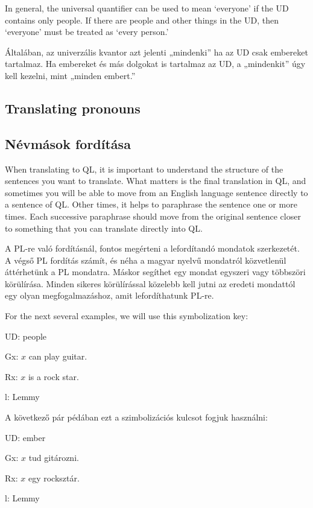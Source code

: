 In general, the universal quantifier can be used to mean `everyone' if the UD contains only people. If there are people and other things in the UD, then `everyone' must be treated as `every person.'

Általában, az univerzális kvantor azt jelenti „mindenki” ha az UD csak embereket tartalmaz. Ha embereket és más dolgokat is tartalmaz az UD, a „mindenkit” úgy kell kezelni, mint „minden embert.”





\subsection*{Translating pronouns}
\subsection{Névmások fordítása}
When translating to QL, it is important to understand the structure of the sentences you want to translate. What matters is the final translation in QL, and sometimes you will be able to move from an English language sentence directly to a sentence of QL. Other times, it helps to paraphrase the sentence one or more times. Each successive paraphrase should move from the original sentence closer to something that you can translate directly into QL.


A PL-re való fordításnál, fontos megérteni a lefordítandó mondatok szerkezetét. A végső PL fordítás számít, és néha a magyar nyelvű mondatról közvetlenül áttérhetünk a PL mondatra. Máskor segíthet egy mondat egyszeri vagy többszöri körülírása. Minden sikeres körülírással közelebb kell jutni az eredeti mondattól egy olyan megfogalmazáshoz, amit lefordíthatunk PL-re.

For the next several examples, we will use this symbolization key:

\begin{ekey}
\item[UD:] people
\item[Gx:] $x$ can play guitar.
\item[Rx:] $x$ is a rock star.
\item[l:] Lemmy
\end{ekey}

A következő pár pédában ezt a szimbolizációs kulcsot fogjuk használni:

\begin{ekey}
\item[UD:] ember
\item[Gx:] $x$ tud gitározni.
\item[Rx:] $x$ egy rocksztár.
\item[l:] Lemmy
\end{ekey}

